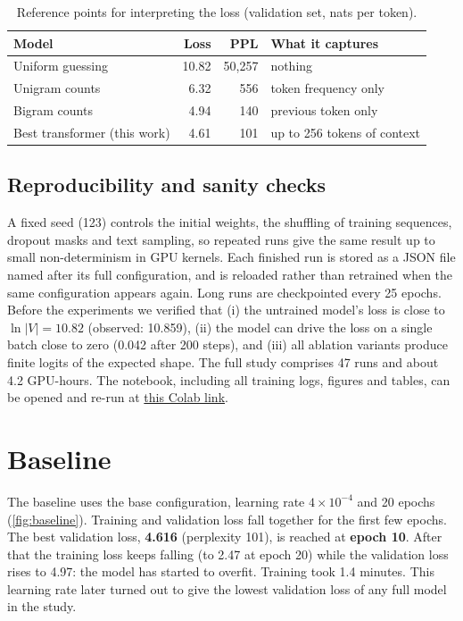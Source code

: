 \documentclass[11pt,a4paper]{article}
\newcommand{\colaburl}{https://colab.research.google.com/drive/1zfz-atgfb0Z72t7IwxTM5HA-_C3_LFRG?usp=sharing}
\begin{document}
\begin{table}[h]
  \centering
  \caption{Reference points for interpreting the loss (validation set, nats per token).}
  \label{tab:reference}
  \begin{tabular}{lrrl}
    \toprule
    Model & Loss & PPL & What it captures \\
    \midrule
    Uniform guessing & 10.82 & 50,257 & nothing \\
    Unigram counts & 6.32 & 556 & token frequency only \\
    Bigram counts & 4.94 & 140 & previous token only \\
    Best transformer (this work) & 4.61 & 101 & up to 256 tokens of context \\
    \bottomrule
  \end{tabular}
\end{table}

\subsection{Reproducibility and sanity checks}
A fixed seed (123) controls the initial weights, the shuffling of training sequences, dropout masks and text sampling, so repeated runs give the same result up to small non-determinism in GPU kernels. Each finished run is stored as a JSON file named after its full configuration, and is reloaded rather than retrained when the same configuration appears again. Long runs are checkpointed every 25 epochs. Before the experiments we verified that (i) the untrained model's loss is close to $\ln|V| = 10.82$ (observed: 10.859), (ii) the model can drive the loss on a single batch close to zero (0.042 after 200 steps), and (iii) all ablation variants produce finite logits of the expected shape. The full study comprises 47 runs and about 4.2 GPU-hours. The notebook, including all training logs, figures and tables, can be opened and re-run at \href{\colaburl}{this Colab link}.

\section{Baseline}\label{sec:baseline}

The baseline uses the base configuration, learning rate $4\times10^{-4}$ and 20 epochs (\cref{fig:baseline}). Training and validation loss fall together for the first few epochs. The best validation loss, \textbf{4.616} (perplexity 101), is reached at \textbf{epoch 10}. After that the training loss keeps falling (to 2.47 at epoch 20) while the validation loss rises to 4.97: the model has started to overfit. Training took 1.4 minutes. This learning rate later turned out to give the lowest validation loss of any full model in the study.
\end{document}
